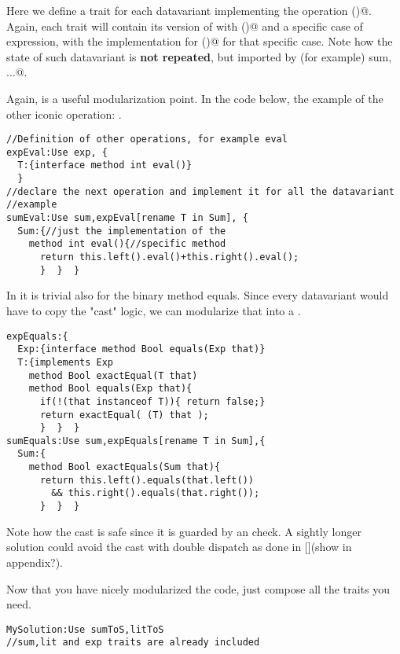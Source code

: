 Here we define a trait for each datavariant implementing the operation \Q@toString()@.
Again, each trait will contain its version of \Q@Exp@ with \Q@toString()@
and a specific case of expression, with the implementation for \Q@toString()@
for that specific case. Note how the state of such datavariant is 
\textbf{not repeated}, but imported by (for example) \Q@Use sum, ...@.

Again, \Q@expToS@ is a useful modularization point.
In the code below, the example of the other iconic operation: \Q@eval@.

\begin{lstlisting}
//Definition of other operations, for example eval
expEval:Use exp, {
  T:{interface method int eval()}
  }
//declare the next operation and implement it for all the datavariant
//example
sumEval:Use sum,expEval[rename T in Sum], {
  Sum:{//just the implementation of the
    method int eval(){//specific method
      return this.left().eval()+this.right().eval();
      }  }  }
\end{lstlisting}
In \name it is trivial also for the binary method equals.
Since every datavariant would have to copy the "cast" logic,
 we can modularize that into a \Q@expEquals@.

\begin{lstlisting}
expEquals:{
  Exp:{interface method Bool equals(Exp that)}
  T:{implements Exp
    method Bool exactEqual(T that)
    method Bool equals(Exp that){
      if(!(that instanceof T)){ return false;}
      return exactEqual( (T) that );
      }  }  }
sumEquals:Use sum,expEquals[rename T in Sum],{
  Sum:{
    method Bool exactEquals(Sum that){
      return this.left().equals(that.left()) 
        && this.right().equals(that.right());
      }  }  }
\end{lstlisting}
Note how the cast is safe since it is guarded by
an \Q@instanceof@ check. A sightly longer solution could avoid the
cast with double dispatch as done in [](show in appendix?).

Now that you have nicely modularized the code, just compose all the traits you need.
\begin{lstlisting}
MySolution:Use sumToS,litToS
//sum,lit and exp traits are already included
\end{lstlisting}

